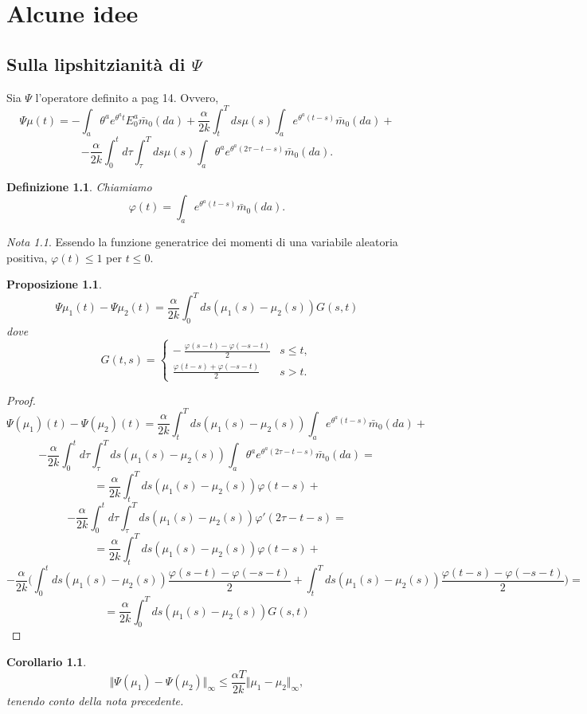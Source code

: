 \documentclass[a4paper]{book}
\theoremstyle{plain}
\newtheorem{prop}[thm]{Proposizione}
\newtheorem{cor}[thm]{Corollario}
\theoremstyle{definizione}
\newtheorem{defn}[thm]{Definizione}
\theoremstyle{remark}
\newtheorem{rem}[thm]{Nota}
\numberwithin{equation}{section}
\begin{document}
\chapter{Alcune idee}
\section{Sulla lipshitzianità di $\Psi$}
	Sia $\Psi$ l'operatore definito a pag 14.
	Ovvero, 
	$$\Psi\mu(t)=-\int_a\theta^a e^{\theta^at}E_0^a\bar{m}_0(da)+\frac{\alpha}{2k}\int_t^Tds\mu(s)\int_a e^{\theta^a(t-s)}\bar{m}_0(da)+$$
	$$-\frac{\alpha}{2k}\int_0^td\tau\int_\tau^Tds\mu(s)\int_a \theta^ae^{\theta^a(2\tau-t-s)}\bar{m}_0(da).$$
	
	\begin{defn}
	Chiamiamo $$\varphi(t)=\int_a e^{\theta^a(t-s)}\bar{m}_0(da).$$
		\end{defn}
		
	\begin{rem}
	Essendo la funzione generatrice dei momenti di una variabile aleatoria positiva, $\varphi(t)\le 1$ per $t\le 0$.
	\end{rem}
		
	\begin{prop}
	$$\Psi\mu_1(t)-\Psi\mu_2(t)=\frac{\alpha}{2k}\int_0^T ds (\mu_1(s)-\mu_2(s))G(s,t)$$
	dove
		$$G(t,s)=\begin{cases}
	-\ \displaystyle\frac{\varphi(s-t)-\varphi(-s-t)}{2} & s\le t, \\
	\displaystyle\frac{\varphi(t-s)+\varphi(-s-t)}{2} & s>t.
	\end{cases}$$
	\end{prop}
	\begin{proof}
		$$\Psi(\mu_1)(t)-\Psi(\mu_2)(t)=\frac{\alpha}{2k}\int_t^Tds (\mu_1(s)-\mu_2(s))\int_a e^{\theta^a(t-s)}\bar{m}_0(da)+$$
	$$-\frac{\alpha}{2k}\int_0^td\tau\int_\tau^Tds (\mu_1(s)-\mu_2(s))\int_a \theta^ae^{\theta^a(2\tau-t-s)}\bar{m}_0(da)=$$
	$$=\frac{\alpha}{2k}\int_t^Tds (\mu_1(s)-\mu_2(s))\varphi(t-s)+$$
	$$-\frac{\alpha}{2k}\int_0^td\tau\int_\tau^Tds (\mu_1(s)-\mu_2(s))\varphi'(2\tau-t-s)=$$
		$$=\frac{\alpha}{2k}\int_t^Tds (\mu_1(s)-\mu_2(s))\varphi(t-s)+$$
	$$-\frac{\alpha}{2k}\bigg(\int_0^tds (\mu_1(s)-\mu_2(s))\displaystyle\frac{\varphi(s-t)-\varphi(-s-t)}{2}+\int_t^Tds (\mu_1(s)-\mu_2(s))\displaystyle\frac{\varphi(t-s)-\varphi(-s-t)}{2}\bigg)=$$
	$$=\frac{\alpha}{2k}\int_0^T ds (\mu_1(s)-\mu_2(s))G(s,t)$$
	\end{proof}
	
	\begin{cor}
	$$\Vert\Psi(\mu_1)-\Psi(\mu_2)\Vert_\infty\le \frac{\alpha T}{2k}\Vert\mu_1-\mu_2\Vert_\infty,$$ tenendo conto della nota precedente.
	\end{cor}
	
\end{document}
